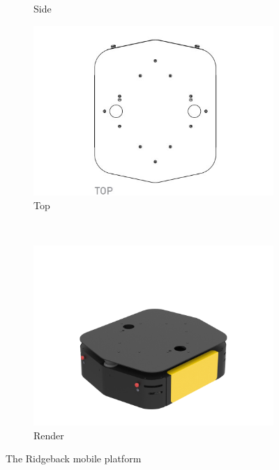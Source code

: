 \documentclass[times, utf8, diplomski, english]{fer}
\begin{document}
\begin{figure}[h]
\begin{subfigure}[t]{0.34\textwidth}
        \caption{Side}
    \end{subfigure}
    \begin{subfigure}[t]{0.34\textwidth}
        \includegraphics[width=\textwidth]{rb_top}
        \caption{Top}
    \end{subfigure}
     ~%
    \begin{subfigure}[t]{0.34\textwidth}
        \includegraphics[width=\textwidth]{ridgeback}
        \caption{Render}
    \end{subfigure}
    \caption{The Ridgeback mobile platform}\label{fig:ridgeback}
\end{figure}
\end{document}
